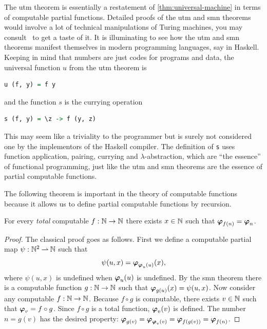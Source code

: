\noindent
The utm theorem is essentially a restatement of
\cref{thm:universal-machine} in terms of computable partial
functions. Detailed proofs of the utm and smn theorems would involve
a lot of technical manipulations of Turing machines, you may consult~ to get a taste of it.
It is illuminating to see how the utm and smn theorems manifest themselves in modern programming languages, say in Haskell. Keeping in mind that numbers are just codes for programs and data, the universal function $u$ from the utm theorem is
%
\begin{lstlisting}[language=Haskell]
u (f, y) = f y
\end{lstlisting}
%
and the function $s$ is the currying operation
%
\begin{lstlisting}[language=Haskell]
s (f, y) = \z -> f (y, z)
\end{lstlisting}
%
This may seem like a triviality to the programmer but is surely not
considered one by the implementors of the Haskell compiler. The definition of \lstinline!s! uses function application, pairing, currying and $\lambda$-abstraction, which are ``the essence'' of functional programming, just like the utm and smn theorems are the essence of partial computable functions.

The following theorem is important in the theory of computable
functions because it allows us to define partial computable functions
by recursion.

\begin{theorem}
  For every \emph{total} computable $f : \mathbb{N} \to \mathbb{N}$ there exists $x
  \in \mathbb{N}$ such that $\text{\boldmath{$\varphi$}}_{f(n)} = \text{\boldmath{$\varphi$}}_{n}$.
\end{theorem}

\begin{proof}
  The classical proof goes as follows. First we define a computable
  partial map $\psi : \mathbb{N}^2 \mathbin{\rightharpoonup} \mathbb{N}$ such that
  \begin{equation*}
    \psi(u, x) = \text{\boldmath{$\varphi$}}_{\text{\boldmath{$\varphi$}}_{u}(u)}(x),
  \end{equation*}
  where $\psi(u, x)$ is undefined when $\text{\boldmath{$\varphi$}}_{u}(u)$ is undefined.
  By the smn theorem there is a computable function $g : \mathbb{N} \to \mathbb{N}$
  such that $\text{\boldmath{$\varphi$}}_{g(u)}(x) = \psi(u, x)$. Now consider any computable
  $f : \mathbb{N} \to \mathbb{N}$. Because $f \circ g$ is computable, there exists
  $v \in \mathbb{N}$ such that $\text{\boldmath{$\varphi$}}_{v} = f \circ g$. Since $f \circ g$ is a
  total function, $\text{\boldmath{$\varphi$}}_{v}(v)$ is defined. The number $n = g(v)$ has
  the desired property:
  $\text{\boldmath{$\varphi$}}_{g(v)} = \text{\boldmath{$\varphi$}}_{\text{\boldmath{$\varphi$}}_{v}(v)} = \text{\boldmath{$\varphi$}}_{f(g(v))} = \text{\boldmath{$\varphi$}}_{f(n)}$.
\end{proof}

